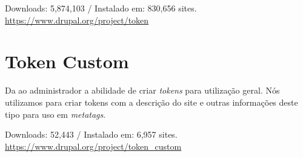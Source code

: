 \begin{center}
  Downloads: 5,874,103 / Instalado em: 830,656 sites. \\
  \url{https://www.drupal.org/project/token}
\end{center}

\section{Token Custom}
Da ao administrador a abilidade de criar \textit{tokens} para utilização geral. Nós utilizamos para criar tokens com a descrição do site e outras informações deste tipo para uso em \textit{metatags}.

\begin{center}
  Downloads: 52,443 / Instalado em: 6,957 sites. \\
  \url{https://www.drupal.org/project/token_custom}
\end{center}
